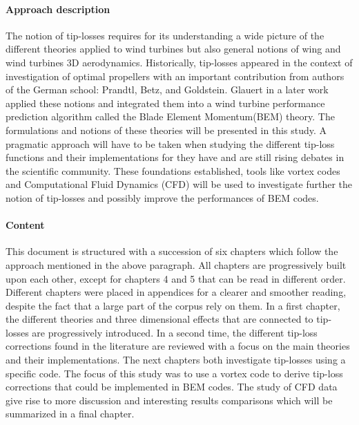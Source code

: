 \documentclass[a4paper,11pt]{book}
\begin{document}
\paragraph{Approach description} The notion of tip-losses requires for its understanding a wide picture of the different theories applied to wind turbines but also general notions of wing and wind turbines 3D aerodynamics. Historically, tip-losses appeared in the context of investigation of optimal propellers with an important contribution from authors of the German school: Prandtl, Betz, and Goldstein. Glauert in a later work applied these notions and integrated them into a wind turbine performance prediction algorithm called the Blade Element Momentum(BEM) theory. The formulations and notions of these theories will be presented in this study. A pragmatic approach will have to be taken when studying the different tip-loss functions and their implementations for they have and are still rising debates in the scientific community. These foundations established, tools like vortex codes and Computational Fluid Dynamics (CFD) will be used to investigate further the notion of tip-losses and possibly improve the performances of BEM codes.


\paragraph{Content} This document is structured with a succession of six chapters which follow the approach mentioned in the above paragraph. All chapters are progressively built upon each other, except for chapters 4 and 5 that can be read in different order. Different chapters were placed in appendices for a clearer and smoother reading, despite the fact that a large part of the corpus rely on them. In a first chapter, the different theories and three dimensional effects that are connected to tip-losses are progressively introduced. In a second time, the different tip-loss corrections found in the literature are reviewed with a focus on the main theories and their implementations. The next chapters both investigate tip-losses using a specific code. The focus of this study was to use a vortex code to derive tip-loss corrections that could be implemented in BEM codes. The study of CFD data give rise to more discussion and interesting results comparisons which will be summarized in a final chapter.
\end{document}

